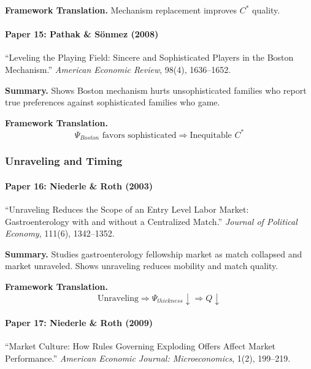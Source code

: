\textbf{Framework Translation.}
Mechanism replacement improves $C^*$ quality.

\paragraph{Paper 15: Pathak \& Sönmez (2008)}

``Leveling the Playing Field: Sincere and Sophisticated Players in the 
Boston Mechanism.''
\textit{American Economic Review}, 98(4), 1636--1652.

\textbf{Summary.}
Shows Boston mechanism hurts unsophisticated families who report true 
preferences against sophisticated families who game.

\textbf{Framework Translation.}
\begin{equation}
\Psi_{Boston} \text{ favors sophisticated} \Rightarrow \text{Inequitable } C^*
\end{equation}

\subsubsection{Unraveling and Timing}

\paragraph{Paper 16: Niederle \& Roth (2003)}

``Unraveling Reduces the Scope of an Entry Level Labor Market: 
Gastroenterology with and without a Centralized Match.''
\textit{Journal of Political Economy}, 111(6), 1342--1352.

\textbf{Summary.}
Studies gastroenterology fellowship market as match collapsed and 
market unraveled. Shows unraveling reduces mobility and match quality.

\textbf{Framework Translation.}
\begin{equation}
\text{Unraveling} \Rightarrow \Psi_{thickness} \downarrow \Rightarrow Q \downarrow
\end{equation}

\paragraph{Paper 17: Niederle \& Roth (2009)}

``Market Culture: How Rules Governing Exploding Offers Affect Market 
Performance.''
\textit{American Economic Journal: Microeconomics}, 1(2), 199--219.

